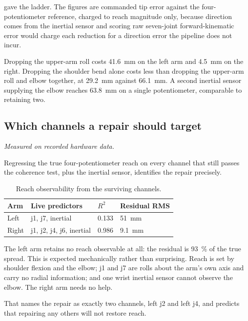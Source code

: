  gave the ladder. The figures are commanded tip error
against the four-potentiometer reference, charged to reach magnitude only,
because direction comes from the inertial sensor and scoring raw seven-joint
forward-kinematic error would charge each reduction for a direction error the
pipeline does not incur.

Dropping the upper-arm roll costs \SI{41.6}{\milli\metre} on the left arm and
\SI{4.5}{\milli\metre} on the right. Dropping the shoulder bend alone costs
less than dropping the upper-arm roll and elbow together, at
\SI{29.2}{\milli\metre} against \SI{66.1}{\milli\metre}. A second inertial
sensor supplying the elbow reaches \SI{63.8}{\milli\metre} on a single
potentiometer, comparable to retaining two.

\subsection{Which channels a repair should target}

\emph{Measured on recorded hardware data.}

Regressing the true four-potentiometer reach on every channel that still
passes the coherence test, plus the inertial sensor, identifies the repair
precisely.

\begin{table}[htbp]
  \centering
  \caption{Reach observability from the surviving channels.}
  \label{tab:reachobs}
  \begin{tabular}{@{}llll@{}}
    \toprule
    Arm & Live predictors & $R^2$ & Residual RMS \\
    \midrule
    Left  & j1, j7, inertial            & \num{0.133} & \SI{51}{\milli\metre} \\
    Right & j1, j2, j4, j6, inertial    & \num{0.986} & \SI{9.1}{\milli\metre} \\
    \bottomrule
  \end{tabular}
\end{table}

The left arm retains no reach observable at all: the residual is
\SI{93}{\percent} of the true spread. This is expected mechanically rather
than surprising. Reach is set by shoulder flexion and the elbow; j1 and j7 are
rolls about the arm's own axis and carry no radial information; and one wrist
inertial sensor cannot observe the elbow. The right arm needs no help.

That names the repair as exactly two channels, left j2 and left j4, and
predicts that repairing any others will not restore reach.

